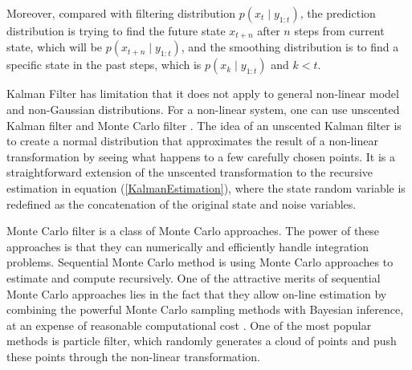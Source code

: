 Moreover, compared with filtering distribution $p(x_t\mid y_{1:t})$, the prediction distribution is trying to find the future state $x_{t+n}$ after $n$ steps from current state, which will be $p(x_{t+n}\mid y_{1:t})$, and the smoothing distribution is to find a specific state in the past steps, which is $p(x_k\mid y_{1:t})$ and $k<t$. 


Kalman Filter has limitation that it does not apply to general non-linear model and non-Gaussian distributions. For a non-linear system, one can use unscented Kalman filter \cite{wan2000unscented} and Monte Carlo filter \cite{chen2003bayesian}. The idea of an unscented Kalman filter is to create a normal distribution that approximates the result of a non-linear transformation by seeing what happens to a few carefully chosen points. It is a straightforward extension of the unscented transformation to the recursive estimation in equation (\ref{KalmanEstimation}), where the state random variable is redefined as the concatenation of the original state and noise variables. 

Monte Carlo filter is a class of Monte Carlo approaches. The power of these approaches is that they can numerically and efficiently handle integration problems. 
Sequential Monte Carlo method is using Monte Carlo approaches to estimate and compute recursively. One of the attractive merits of sequential Monte Carlo approaches lies in the fact that they allow on-line estimation by combining the powerful Monte Carlo sampling methods with Bayesian inference, at an expense of reasonable computational cost \cite{chen2003bayesian}. One of the most popular methods is particle filter, which randomly generates a cloud of points and push these points through the non-linear transformation. 


